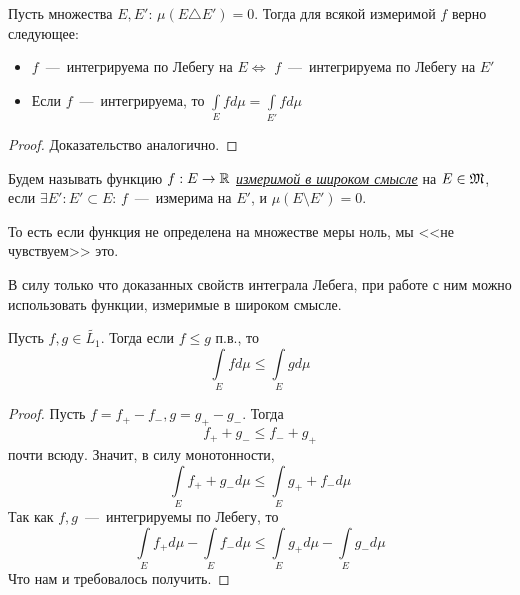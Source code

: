 \begin{proposition}
    Пусть множества $E, E'$: $\mu(E \triangle E') = 0$. Тогда для всякой измеримой $f$ верно следующее:
    \begin{itemize}
        \item $f$~---~интегрируема по Лебегу на $E \Longleftrightarrow$ $f$~---~интегрируема по Лебегу на $E'$
        \item Если $f$~---~интегрируема, то $\int\limits_E fd\mu = \int\limits_{E'} fd\mu$
    \end{itemize}
\end{proposition}
\begin{proof}
    Доказательство аналогично.
\end{proof}

\begin{definition}
    Будем называть функцию $f: E \rightarrow \mathbb{R}$ \textit{
\underline{измеримой в широком смысле}} на $E \in \mathfrak{M}$, если $\exists E': E'\subset E$: $f$~---~измерима на $E'$, и $\mu(E\setminus E') = 0$. \\
\end{definition}

\begin{remark}
    То есть если функция не определена на множестве меры ноль, мы <<не чувствуем>> это.
\end{remark}

\begin{note}
    В силу только что доказанных свойств интеграла Лебега, при работе с ним можно использовать функции, измеримые в широком смысле.
\end{note}

\begin{proposition}
    Пусть $f, g \in \widetilde{L_1}$. Тогда если $f \leq g$ п.в., то \[\int\limits_E fd\mu \leq \int\limits_E gd\mu\]
\end{proposition}
\begin{proof}
    Пусть $f = f_+ - f_-, g = g_+ - g_-$. Тогда \[f_+ + g_- \leq f_- + g_+ \]
    почти всюду. Значит, в силу монотонности, \[\int\limits_E f_+ + g_- d\mu \leq \int\limits_E g_+ + f_- d\mu\]
    Так как $f, g$~---~интегрируемы по Лебегу, то \[\int\limits_E f_+d\mu - \int\limits_E f_-d\mu \leq \int\limits_E g_+d\mu - \int\limits_E g_-d\mu\]
    Что нам и требовалось получить.
\end{proof}


